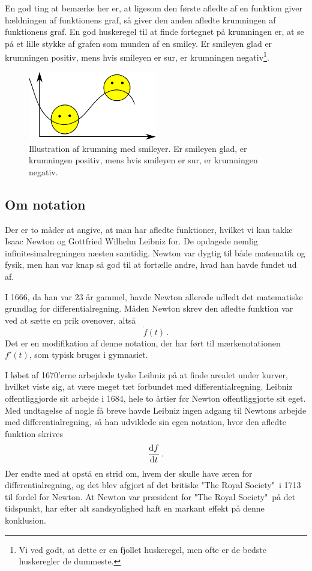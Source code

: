 En god ting at bemærke her er, at ligesom den første afledte af en funktion giver hældningen af funktionens graf, så giver den anden afledte krumningen af funktionens graf.
En god huskeregel til at finde fortegnet på krumningen er, at se på et lille stykke af grafen som munden af en smiley. Er smileyen glad er krumningen positiv, mens hvis smileyen er sur, er krumningen negativ\footnote{Vi ved godt, at dette er en fjollet huskeregel, men ofte er de bedste huskeregler de dummeste.}.
\begin{figure}[H]
    \centering
    \includegraphics[width = 0.5\textwidth]{matfig/smiley.pdf}
    \caption{Illustration af krumning med smileyer. Er smileyen glad, er krumningen positiv, mens hvis smileyen er sur, er krumningen negativ.}
    \label{fig:my_label}
\end{figure}

\subsection{Om notation}
Der er to måder at angive, at man har afledte funktioner, hvilket vi kan takke Isaac  Newton og Gottfried Wilhelm Leibniz for. De opdagede nemlig infinitesimalregningen næsten samtidig. Newton var dygtig til både matematik og fysik, men han var knap så god til at fortælle andre, hvad han havde fundet ud af.

I 1666, da han var 23 år gammel, havde Newton allerede udledt det matematiske grundlag for differentialregning. Måden Newton skrev den afledte funktion var ved at sætte en prik ovenover, altså
\begin{equation*}
    \dot{f}(t) \, .
\end{equation*}
Det er en modifikation af denne notation, der har ført til mærkenotationen $f'(t)$, som typisk bruges i gymnasiet.

I løbet af 1670'erne arbejdede tyske Leibniz på at finde arealet under kurver, hvilket viste sig, at være meget tæt forbundet med differentialregning. Leibniz offentliggjorde sit arbejde i 1684, hele to årtier før Newton offentliggjorte sit eget. 
Med undtagelse af nogle få breve havde Leibniz ingen adgang til Newtons arbejde med differentialregning, så han udviklede sin egen notation, hvor den afledte funktion skrives
\begin{equation*}
    \dv{f}{t} \, .
\end{equation*}
Der endte med at opstå en strid om, hvem der skulle have æren for differentialregning, og det blev afgjort af det britiske "The Royal Society"$\,$ i 1713 til fordel for Newton. At Newton var præsident for "The Royal Society"$\,$ på det tidspunkt, har efter alt sandsynlighed haft en markant effekt på denne konklusion.

